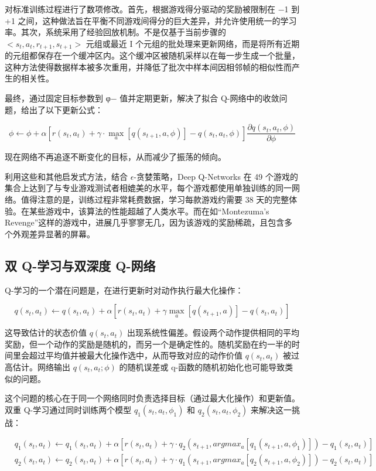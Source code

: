 对标准训练过程进行了数项修改。首先，根据游戏得分驱动的奖励被限制在 −1 到 +1 之间，这种做法旨在平衡不同游戏间得分的巨大差异，并允许使用统一的学习率。其次，系统采用了经验回放机制。不是仅基于当前步骤的 \(<s_t, a_t, r_{t+1}, s_{t+1}>\) 元组或最近 I 个元组的批处理来更新网络，而是将所有近期的元组都保存在一个缓冲区内。这个缓冲区被随机采样以在每一步生成一个批量，这种方法使得数据样本被多次重用，并降低了批次中样本间因相邻帧的相似性而产生的相关性。

最终，通过固定目标参数到 φ− 值并定期更新，解决了拟合 Q-网络中的收敛问题，给出了以下更新公式：

\[
\phi \leftarrow \phi + \alpha \left[ r(s_t, a_t) + \gamma \cdot \max_a [q(s_{t+1}, a, \phi)] - q(s_t, a_t, \phi) \right] \frac{\partial q(s_t, a_t, \phi)}{\partial \phi} \tag{19.18}
\]


现在网络不再追逐不断变化的目标，从而减少了振荡的倾向。

利用这些和其他启发式方法，结合 \(\epsilon\)-贪婪策略，Deep Q-Networks 在 49 个游戏的集合上达到了与专业游戏测试者相媲美的水平，每个游戏都使用单独训练的同一网络。值得注意的是，训练过程非常耗费数据，学习每款游戏约需要 38 天的完整体验。在某些游戏中，该算法的性能超越了人类水平。而在如“Montezuma's Revenge”这样的游戏中，进展几乎寥寥无几，因为该游戏的奖励稀疏，且包含多个外观差异显著的屏幕。

\subsection{双 Q-学习与双深度 Q-网络}
Q-学习的一个潜在问题是，在进行更新时对动作执行最大化操作：

\[
q(s_t, a_t) \leftarrow q(s_t, a_t) + \alpha \left[ r(s_t, a_t) + \gamma \max_{a} [q(s_{t+1}, a)] - q(s_t, a_t) \right] \tag{19.19}
\]

这导致估计的状态价值 \(q(s_t, a_t)\) 出现系统性偏差。假设两个动作提供相同的平均奖励，但一个动作的奖励是随机的，而另一个是确定性的。随机奖励在约一半的时间里会超过平均值并被最大化操作选中，从而导致对应的动作价值 \(q(s_t, a_t)\) 被过高估计。网络输出 \(q(s_t, a_t; \phi)\) 的随机误差或 q-函数的随机初始化也可能导致类似的问题。

这个问题的核心在于同一个网络同时负责选择目标（通过最大化操作）和更新值。双重 Q-学习通过同时训练两个模型 \(q_1(s_t, a_t, \phi_1)\) 和 \(q_2(s_t, a_t, \phi_2)\) 来解决这一挑战：


\begin{align}
&q_1(s_t, a_t) \leftarrow q_1(s_t, a_t) + \alpha \left[ r(s_t, a_t) + \gamma \cdot q_2 \left( s_{t+1}, argmax_{a} [q_1(s_{t+1}, a, \phi_1)] \right) - q_1(s_t, a_t) \right] \\
&q_2(s_t, a_t) \leftarrow q_2(s_t, a_t) + \alpha \left[ r(s_t, a_t) + \gamma \cdot q_1 \left( s_{t+1}, argmax_{a} [q_2(s_{t+1}, a, \phi_2)] \right) - q_2(s_t, a_t) \right]
\end{align} 



